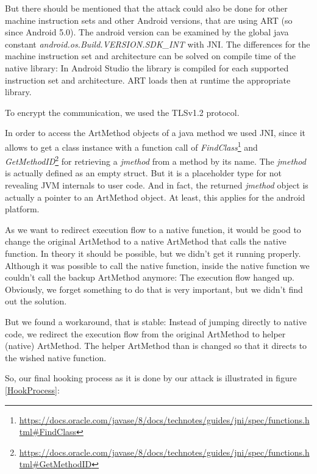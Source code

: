 But there should be mentioned that the attack could also be done for other machine instruction sets and other Android versions, that are using ART (so since Android 5.0). The android version can be examined by the global java constant \emph{android.os.Build.VERSION.SDK\_INT} with JNI.
The differences for the machine instruction set and architecture can be solved on compile time of the native library: In Android Studio the library is compiled for each supported instruction set and architecture. ART loads then at runtime the appropriate library.

To encrypt the communication, we used the TLSv1.2 protocol. 

In order to access the ArtMethod objects of a java method we used JNI, since it allows to get a class instance with a function call of  \emph{FindClass}\footnote{\url{https://docs.oracle.com/javase/8/docs/technotes/guides/jni/spec/functions.html\#FindClass}} and \emph{GetMethodID}\footnote{\url{https://docs.oracle.com/javase/8/docs/technotes/guides/jni/spec/functions.html\#GetMethodID}} for retrieving a \emph{jmethod} from a method by its name. The \emph{jmethod} is actually defined as an empty struct. But it is a placeholder type for not revealing JVM internals to user code. And in fact, the returned \emph{jmethod} object is actually a pointer to an ArtMethod object. At least, this applies for the android platform.


As we want to redirect execution flow to a native function, it would be good to change the original ArtMethod to a native ArtMethod that calls the native function. In theory it should be possible, but we didn't get it running properly. Although it was possible to call the native function, inside the native function we couldn't call the backup ArtMethod anymore: The execution flow hanged up. Obviously, we forget something to do that is very important, but we didn't find out the solution. 

But we found a workaround, that is stable: Instead of jumping directly to native code, we redirect the execution flow from the original ArtMethod to helper (native) ArtMethod. The helper ArtMethod than is changed so that it directs to the wished native function.

So, our final hooking process as it is done by our attack is illustrated in figure \ref{HookProcess}:


